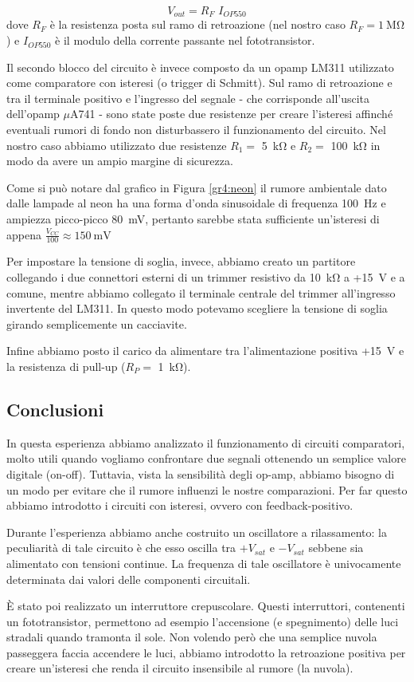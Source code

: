 \begin{equation}
	V_{out} = R_F \,\, I_{OP550}
\end{equation}
dove $R_F$ è la resistenza posta sul ramo di retroazione (nel nostro caso $R_F = \SI{1}{\Mohm}$) e $I_{OP550}$ è il modulo della corrente passante nel fototransistor.

Il secondo blocco del circuito è invece composto da un opamp LM311 utilizzato come comparatore con isteresi (o trigger di Schmitt).
Sul ramo di retroazione e tra il terminale positivo e l'ingresso del segnale - che corrisponde all'uscita dell'opamp $\mu$A741 - sono state poste due resistenze per creare l'isteresi affinché eventuali rumori di fondo non disturbassero il funzionamento del circuito.
Nel nostro caso abbiamo utilizzato due resistenze $R_1 =$ \SI{5}{\kohm} e $R_2=$ \SI{100}{\kohm} in modo da avere un ampio margine di sicurezza.

Come si può notare dal grafico in Figura \ref{gr4:neon} il rumore ambientale dato dalle lampade al neon ha una forma d'onda sinusoidale di frequenza \SI{100}{\hertz} e ampiezza picco-picco \SI{80}{\mV}, pertanto sarebbe stata sufficiente un'isteresi di appena $\frac{V_{CC}}{100} \approx \SI{150}{\mV}$

Per impostare la tensione di soglia, invece, abbiamo creato un partitore collegando i due connettori esterni di un trimmer resistivo da \SI{10}{\kohm} a +\SI{15}{\V} e a comune, mentre abbiamo collegato il terminale centrale del trimmer all'ingresso invertente del LM311.
In questo modo potevamo scegliere la tensione di soglia girando semplicemente un cacciavite.

Infine abbiamo posto il carico da alimentare tra l'alimentazione positiva +\SI{15}{\V} e la resistenza di pull-up ($R_P=$ \SI{1}{\kohm}).

\subsection*{Conclusioni}

In questa esperienza abbiamo analizzato il funzionamento di circuiti comparatori, molto utili quando vogliamo confrontare due segnali ottenendo un semplice valore digitale (on-off).
Tuttavia, vista la sensibilità degli op-amp, abbiamo bisogno di un modo per evitare che il rumore influenzi le nostre comparazioni.
Per far questo abbiamo introdotto i circuiti con isteresi, ovvero con feedback-positivo.

Durante l'esperienza abbiamo anche costruito un oscillatore a rilassamento: la peculiarità di tale circuito è che esso oscilla tra $+V_{sat}$ e $-V_{sat}$ sebbene sia alimentato con tensioni continue.
La frequenza di tale oscillatore è univocamente determinata dai valori delle componenti circuitali.

È stato poi realizzato un interruttore crepuscolare.
Questi interruttori, contenenti un fototransistor, permettono ad esempio l'accensione (e spegnimento) delle luci stradali quando tramonta il sole.
Non volendo però che una semplice nuvola passeggera faccia accendere le luci, abbiamo introdotto la retroazione positiva per creare un'isteresi che renda il circuito insensibile al rumore (la nuvola).
